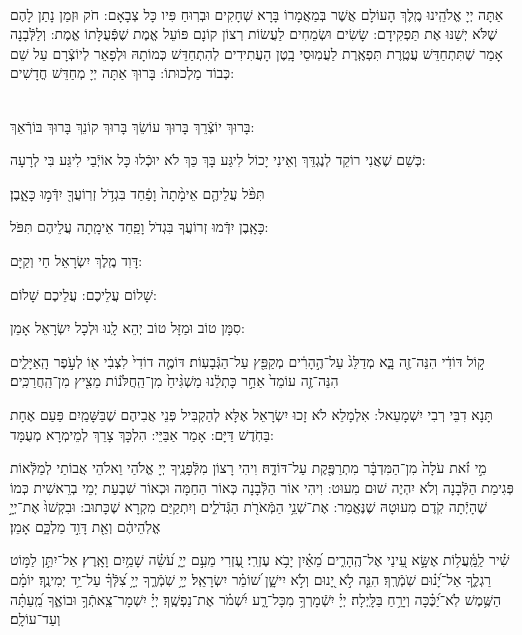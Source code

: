 \documentclass[twoside, openany, parskip=half, 11pt]{book}
\begin{document}
\\
	 אַתָּה יְיָ אֱלֹהֵֽינוּ מֶֽלֶךְ הָעוֹלָם אֲשֶׁר בְּמַאֲמָרוֹ בָּרָא שְׁחָקִים וּבְרֽוּחַ פִּיו כָּל צְבָאָם: חֹק וּזְמַן נָתַן לָהֶם שֶׁלֹּא יְשַׁנּוּ אֶת תַּפְקִידָם: שָׂשִׂים וּשְׂמֵחִים לַעֲשׂוֹת רְצוֹן קוֹנָם פּוֹעֵל אֱמֶת שֶׁפְּֿעֻלָּתוֹ אֱמֶת: וְלַלְּֿבָנָה אָמַר שֶׁתִּתְחַדֵּשׁ עֲטֶֽרֶת תִּפְאֶֽרֶת לַעֲמֽוּסֵי בָֽטֶן הָעֲתִידִים לְהִתְחַדֵּשׁ כְּמוֹתָהּ וּלְפָאֵר לְיוֹצְֿרָם עַל שֵׁם כְּבוֹד מַלְכוּתוֹ: בָּרוּךְ אַתָּה יְיָ מְחַדֵּשׁ חֳדָשִׁים:

\\
בָּרוּךְ יוֹצְֿרֵךְ בָּרוּךְ עוֹשֵׂךְ בָּרוּךְ קוֹנֵךְ בָּרוּךְ בּוֹרְֿאֵךְ:

כְּשֵׁם שֶׁאֲנִי רוֹקֵד לְנֶגְדֵּךְ וְאֵינִי יָכוֹל לִיגַּע בָּךְ 
כַּךְ לֹא יוּכְֿלוּ כָּל אוֹיְֿבַי לִיגַּע בִּי לְרָעָה:

 תִּפֹּ֨ל
  עֲלֵיהֶ֤ם אֵימָ֨תָה֙ וָפַ֔חַד בִּגְדֹ֥ל זְרֽוֹעֲךָ֖ יִדְּֿמ֣וּ כָּאָ֑בֶן׃


 כָּאָֽבֶן יִדְּֿמוּ זְרוֹעֲךָ בִּגְדֹל וָפַֽחַד אֵימָֽתָה עֲלֵיהֶם תִּפֹּל:


 דָּוִד מֶֽלֶךְ יִשְׂרָאֵל חַי וְקַיָּם:

 	שָׁלוֹם עֲלֵיכֶם: \qquad {} 
  עֲלֵיכֶם שָׁלוֹם:


 סִמָּן טוֹב וּמַזָּל טוֹב יְהֵא לָֽנוּ וּלְכָל יִשְׂרָאֵל אָמֵן:

ק֣וֹל דּוֹדִ֔י
 הִנֵּה־זֶ֖ה בָּ֑א מְדַלֵּג֙ עַל־הֶ֣הָרִ֔ים מְקַפֵּ֖ץ עַל־הַגְּֿבָעֽוֹת׃ דּוֹמֶ֤ה דוֹדִי֙ לִצְבִ֔י א֖וֹ לְעֹ֣פֶר הָֽאַיָּלִ֑ים הִנֵּה־זֶ֤ה עוֹמֵד֙ אַחַ֣ר כָּתְלֵ֔נוּ מַשְׁגִּ֨יחַ֙ מִן־הַֽחֲלֹּנ֔וֹת מֵצִ֖יץ מִן־הַֽחֲרַכִּֽים׃

תָּנָא דִבֵּי רְבִי יִשְׁמָעֵאל: אִלְמָלֵא לֹא זָכוּ יִשְׂרָאֵל אֶלָּא לְהַקְבִּיל פְּנֵי אֲבִיהֶם שֶׁבַּשָּׁמַֽיִם פַּעַם אֶחָת בַּחֹֽדֶשׁ דַּיָּם: אָמַר אַבַּיֵּי: הִלְכָּךְ צָרֵךְ לְמֵימְרָא מְעֻמָּד:

מִ֣י זֹ֗את
 עֹלָה֙ מִן־הַמִּדְבָּ֔ר מִתְרַפֶּ֖קֶת עַל־דּוֹדָ֑הּ׃ 
 	וִיהִי רָצוֹן מִלְּֿפָנֶֽיךָ יְיָ אֱלֹהַי וֵאלֹהֵי אֲבוֹתַי לְמַלְּֿאוֹת פְּגִימַת הַלְּֿבָנָה וְלֹא יִהְיֶה שׁוּם מִעוּט: וִיהִי אוֹר הַלְּֿבָנָה כְּאוֹר הַחַמָּה וּכְאוֹר שִׁבְעַת יְמֵי בְרֵאשִׁית כְּמוֹ שֶׁהָיְֿתָה קֹֽדֶם מִעוּטָהּ שֶׁנֶּאֱמַר:
אֶת־שְׁנֵ֥י 
הַמְּֿאֹרֹ֖ת הַגְּֿדֹלִ֑ים וְיִתְקַיַּם מִקְרָא שֶׁכָּתוּב: 
 וּבִקְשׁוּ֙ אֶת־יְיָ֣ אֱלֹֽהֵיהֶ֔ם וְאֵ֖ת דָּוִ֣ד מַלְכָּ֑ם אָמֵן׃


 שִׁ֗יר
  לַֽמַּֽ֫עֲל֥וֹת אֶשָּׂ֣א עֵ֭ינַי אֶל־הֶֽהָרִ֑ים מֵ֝אַ֗יִן יָבֹ֥א עֶזְרִֽי׃ עֶ֭זְרִי מֵעִ֣ם יְיָ֑ עֹ֝שֵׂ֗ה שָׁמַ֥יִם וָאָֽרֶץ׃ אַל־יִתֵּ֣ן לַמּ֣וֹט רַגְלֶ֑ךָ אַל־יָ֝נ֗וּם שֹֽׁמְֿרֶֽךָ׃ הִנֵּ֤ה לֹ֣א יָ֭נוּם וְלֹ֣א יִישָׁ֑ן שׁ֝וֹמֵ֗ר יִשְׂרָאֵֽל׃ יְיָ֥ שֹֽׁמְֿרֶ֑ךָ יְיָ֥ צִ֝לְּֿךָ֗ עַל־יַ֥ד יְמִינֶֽךָ׃ יוֹמָ֗ם הַשֶּׁ֥מֶשׁ לֹֽא־יַ֝כֶּ֗כָּה וְיָרֵ֥חַ בַּלָּֽיְלָה׃ יְיָ֗ יִשְֿׁמָרְךָ֥ מִכָּל־רָ֑ע יִ֝שְׁמֹ֗ר אֶת־נַפְשֶֽׁךָ׃ יְיָ֗ יִשְׁמָר־צֵֽאתְֿךָ֥ וּבוֹאֶ֑ךָ מֵֽ֝עַתָּ֗ה וְעַד־עוֹלָֽם׃
\end{document}
